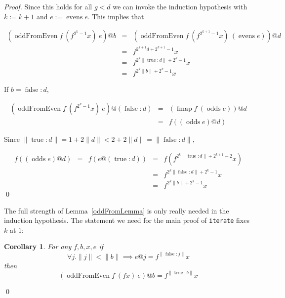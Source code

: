 \documentclass[envcountsect]{llncs}
\DeclareMathOperator{\oddFrom}{oddFromEven}
\DeclareMathOperator{\true}{true}
\DeclareMathOperator{\false}{false}
\DeclareMathOperator{\evens}{evens}
\DeclareMathOperator{\odds}{odds}
\DeclareMathOperator{\fmap}{fmap}
\newcommand{\ord}[1]{\|#1\|}
\newcommand{\cons}[2]{#1:#2}
\newtheorem{corollary}[theorem]{Corollary}
\begin{document}
\begin{proof}
Since this holds for all $g < d$ we can invoke the induction hypothesis with $k := k+1$ and $e := \evens e$.
This implies that

\begin{displaymath}
\begin{array}{rcl}
(\oddFrom f\ (f^{2^k-1}x)\ e)@b & = & (\oddFrom f\ (f^{2^{k+1}-1}x)\ (\evens e))@d \\
& = & f^{2^{k+1}d+2^{k+1}-1} x \\
& = & f^{2^k\ord{\cons{\true}{d}}+2^k-1} x \\
& = & f^{2^k\ord{b}+2^k-1} x
\end{array}
\end{displaymath}

If $b = \cons{\false}{d}$,

\begin{displaymath}
\begin{array}{rcl}
(\oddFrom f\ (f^{2^k-1}x)\ e)@(\cons{\false}{d})& = & (\fmap f\ (\odds e))@d \\
& = & f ((\odds e)@d)
\end{array}
\end{displaymath}

Since
$\ord{\cons{\true}{d}} = 1+2\ord{d} < 2+2\ord{d} = \ord{\cons{\false}{d}}$,

\begin{displaymath}
\begin{array}{rcccl}
f((\odds e)@d) & = & f(e@(\cons{\true}{d})) & = & f(f^{2^k\ord{\cons{\true}{d}}+2^{k+1}-2}x) \\
& & & = & f^{2^k\ord{\cons{\false}{d}}+2^k-1}x \\
& & & = & f^{2^k\ord{b}+2^k-1}x
\end{array}
\end{displaymath}
\qed
\end{proof}

The full strength of Lemma~\ref{oddFromLemma} is only really needed in the induction hypothesis.
The statement we need for the main proof of \verb|iterate| fixes $k$ at $1$:

\begin{corollary}\label{oddFromCorollary}
For any $f, b, x, e$
if
\begin{displaymath}
\forall j . \ord{j} < \ord{b} \implies e@j = f^{\ord{\cons{\false}{j}}}x
\end{displaymath}
then
\begin{displaymath}
(\oddFrom f\ (f x)\ e)@b = f^{\ord{\cons{\true}{b}}}x
\end{displaymath}
\end{corollary}
\qed
\end{document}
